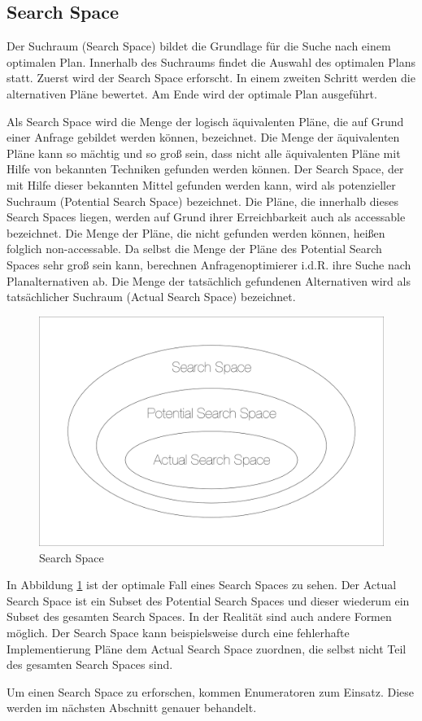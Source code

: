 \subsection{Search Space} 

Der Suchraum (Search Space) bildet die Grundlage für die Suche nach einem optimalen Plan. Innerhalb des Suchraums findet die Auswahl des optimalen Plans statt. 
Zuerst wird der Search Space erforscht. In einem zweiten Schritt werden die alternativen Pläne bewertet. Am Ende wird der optimale Plan ausgeführt.



Als Search Space wird die Menge der logisch äquivalenten Pläne, die auf Grund einer Anfrage gebildet werden können, bezeichnet. Die Menge der äquivalenten Pläne kann so mächtig und so groß sein, dass nicht alle äquivalenten Pläne mit Hilfe von bekannten Techniken gefunden werden können. Der Search Space, der mit Hilfe dieser bekannten Mittel gefunden werden kann, wird als potenzieller Suchraum (Potential Search Space) bezeichnet. Die Pläne, die innerhalb dieses Search Spaces liegen, werden auf Grund ihrer Erreichbarkeit auch als accessable bezeichnet. Die Menge der Pläne, die nicht gefunden werden können, heißen folglich non-accessable. Da selbst die Menge der Pläne des Potential Search Spaces sehr groß sein kann, berechnen Anfragenoptimierer i.d.R. ihre Suche nach Planalternativen ab. Die Menge der tatsächlich gefundenen Alternativen wird als tatsächlicher Suchraum (Actual Search Space) bezeichnet.


\begin{figure}[h]
  \centering
  \includegraphics[width=\textwidth]{02_Grundlagen/SearchSpace.png}
  \caption{Search Space}
  \label{SearchSpace}
\end{figure}

In Abbildung \ref{SearchSpace} ist der optimale Fall eines Search Spaces zu sehen. Der Actual Search Space ist ein Subset des Potential Search Spaces und dieser wiederum ein Subset des gesamten Search Spaces. In der Realität sind auch andere Formen möglich. Der Search Space kann beispielsweise durch eine fehlerhafte Implementierung Pläne dem Actual Search Space zuordnen, die selbst nicht Teil des gesamten Search Spaces sind.

Um einen Search Space zu erforschen,  kommen Enumeratoren zum Einsatz. Diese werden im nächsten Abschnitt genauer behandelt.